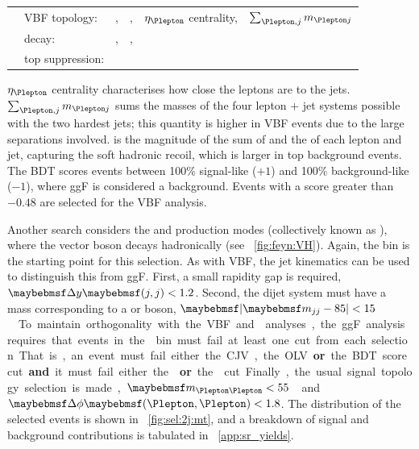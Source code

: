 \begin{listliketab}
	\begin{tabular}{Ll@{\hskip 0.3in}llll}
		\textbullet & VBF topology:    & \mjj, &\dyjj, &$\eta_{\Plepton}$ centrality, &$\sum_{\Plepton, j} m_{\Plepton j}$ \\
		\textbullet & \HWW decay:      & \mll, &\dphill, &\mt \\
		\textbullet & top suppression: & \pttot \\
	\end{tabular}
\end{listliketab}

\noindent
$\eta_{\Plepton}$ centrality characterises how close the leptons are to the jets. 
$\sum_{\Plepton, j} m_{\Plepton j}$ sums the masses of the four lepton + jet systems 
possible with the two hardest jets; this quantity is higher in VBF events due to the large 
separations involved. \pttot is the magnitude of the sum of \corrtrackmetvec and the \ptvec 
of each lepton and jet, capturing the soft hadronic recoil, which is larger in top 
background events. The BDT scores events between 100\% signal-like ($+1$) and 100\% 
background-like ($-1$), where ggF is considered a background. Events with a score greater 
than $-0.48$ are selected for the VBF analysis.

Another search considers the \WH and \ZH production modes (collectively known as \VH), 
where the vector boson decays hadronically (see \Figure~\ref{fig:feyn:VH}). Again, the 
\twojet bin is the starting point for this selection. As with VBF, the jet kinematics can 
be used to distinguish this from ggF. First, a small rapidity gap is required, $\dyjj < 1.2$. 
Second, the dijet system must have a mass corresponding to a \PW or \PZ boson, 
\unit{$\mods{\mjj - 85} < 15$}{\GeV}.

To maintain orthogonality with the VBF and \VH analyses, the ggF analysis requires that 
events in the \twojet bin must fail at least one cut from each selection. That is, an event 
must fail either the CJV, the OLV \textbf{or} the BDT score cut \textbf{and} it must fail 
either the \dyjj \textbf{or} the \mjj cut.

Finally, the usual signal topology selection is made, \unit{$\mll < 55$}{\GeV} and 
$\dphill < 1.8$. 
The \mt distribution of the selected \twojet events is shown in \Figure~\ref{fig:sel:2j:mt}, 
and a breakdown of signal and background contributions is tabulated in 
\Appendix~\ref{app:sr_yields}.

